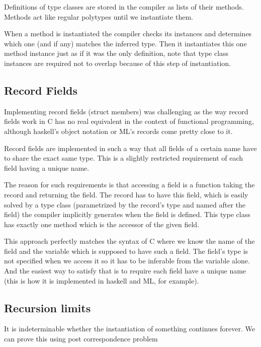 Definitions of type classes are stored in the compiler as lists of their methods. Methods act like regular polytypes until we instantiate them.

When a method is instantiated the compiler checks its instances and determines which one (and if any) matches the inferred type. Then it instantiates this one method instance just as if it was the only definition, note that type class instances are required not to overlap because of this step of instantiation.


\subsection{Record Fields}

Implementing record fields (struct members) was challenging as the way record fields work in C has no real equivalent in the context of functional programming, although haskell's object notation or ML's records come pretty close to it. %

Record fields are implemented in such a way that all fields of a certain name have to share the exact same type. This is a slightly restricted requirement of each field having a unique name.

The reason for such requirements is that accessing a field is a function taking the record and returning the field. The record has to have this field, which is easily solved by a type class (parametrized by the record's type and named after the field) the compiler implicitly generates when the field is defined. This type class has exactly one method which is the accessor of the given field.

This approach perfectly matches the syntax of C where we know the name of the field and the variable which is supposed to have such a field. The field's type is not specified when we access it so it has to be inferable from the variable alone. And the easiest way to satisfy that is to require each field have a unique name (this is how it is implemented in haskell and ML, for example).

\subsection{Recursion limits}

It is indeterminable whether the instantiation of something continues forever. We can prove this using post correspondence problem %

